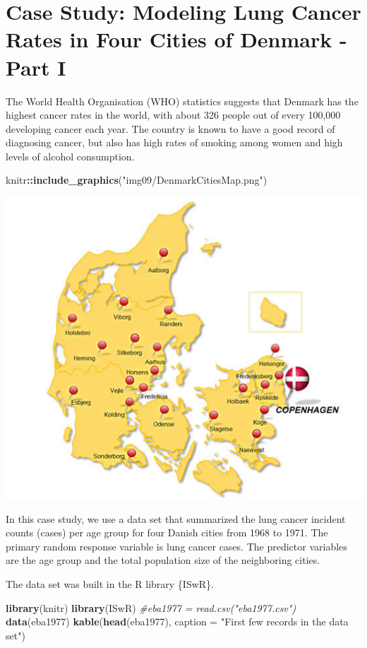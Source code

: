 \documentclass[
]{book}
\newenvironment{Shaded}{\begin{snugshade}}{\end{snugshade}}
\newcommand{\AttributeTok}[1]{\textcolor[rgb]{0.13,0.29,0.53}{#1}}
\newcommand{\CommentTok}[1]{\textcolor[rgb]{0.56,0.35,0.01}{\textit{#1}}}
\newcommand{\FunctionTok}[1]{\textcolor[rgb]{0.13,0.29,0.53}{\textbf{#1}}}
\newcommand{\NormalTok}[1]{#1}
\newcommand{\SpecialCharTok}[1]{\textcolor[rgb]{0.81,0.36,0.00}{\textbf{#1}}}
\newcommand{\StringTok}[1]{\textcolor[rgb]{0.31,0.60,0.02}{#1}}
\begin{document}
\hfill\break

\hypertarget{case-study-modeling-lung-cancer-rates-in-four-cities-of-denmark---part-i}{%
\section{Case Study: Modeling Lung Cancer Rates in Four Cities of Denmark - Part I}\label{case-study-modeling-lung-cancer-rates-in-four-cities-of-denmark---part-i}}

The World Health Organisation (WHO) statistics suggests that Denmark has the highest cancer rates in the world, with about 326 people out of every 100,000 developing cancer each year. The country is known to have a good record of diagnosing cancer, but also has high rates of smoking among women and high levels of alcohol consumption.

\begin{Shaded}
\begin{Highlighting}[]
\NormalTok{knitr}\SpecialCharTok{::}\FunctionTok{include\_graphics}\NormalTok{(}\StringTok{"img09/DenmarkCitiesMap.png"}\NormalTok{)}
\end{Highlighting}
\end{Shaded}

\begin{center}\includegraphics[width=0.6\linewidth]{img09/DenmarkCitiesMap} \end{center}

In this case study, we use a data set that summarized the lung cancer incident counts (cases) per age group for four Danish cities from 1968 to 1971. The primary random response variable is lung cancer cases. The predictor variables are the age group and the total population size of the neighboring cities.

The data set was built in the R library \{ISwR\}.

\begin{Shaded}
\begin{Highlighting}[]
\FunctionTok{library}\NormalTok{(knitr)}
\FunctionTok{library}\NormalTok{(ISwR)}
\CommentTok{\#eba1977 = read.csv("eba1977.csv")}
\FunctionTok{data}\NormalTok{(eba1977)}
\FunctionTok{kable}\NormalTok{(}\FunctionTok{head}\NormalTok{(eba1977), }\AttributeTok{caption =} \StringTok{"First few records in the data set"}\NormalTok{) }
\end{Highlighting}
\end{Shaded}
\end{document}
